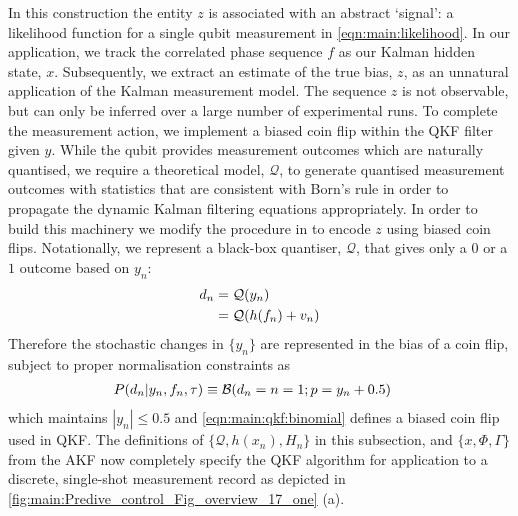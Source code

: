 \documentclass[pra, reprint]{revtex4-1}
\begin{document}
In this construction the entity $z$ is associated with an abstract `signal': a likelihood function for a single qubit measurement in \cref{eqn:main:likelihood}.  In our application, we track the correlated phase sequence $f$ as our Kalman hidden state, $x$. Subsequently, we extract an estimate of the true bias, $z$, as an unnatural application of the Kalman measurement model.  The sequence $z$ is not observable, but can only be inferred over a large number of experimental runs. To complete the measurement action, we implement a biased coin flip within the QKF filter given $y$.  While the qubit provides measurement outcomes which are naturally quantised, we require a theoretical model, $\mathcal{Q}$, to generate quantised measurement outcomes with statistics that are consistent with Born's rule in order to propagate the dynamic Kalman filtering equations appropriately. In order to build this machinery we modify the procedure in \cite{karlsson2005} to encode $z$ using biased coin flips. Notationally, we represent a black-box quantiser, $\mathcal{Q}$, that gives only a $0$ or a $1$ outcome based on $y_n$:
\begin{align}
d_n &= \mathcal{Q}(y_n)\\
&=  \mathcal{Q}(h(f_n) + v_n)
\end{align}
Therefore the stochastic changes in $\{ y_n\}$ are represented in the bias of a coin flip, subject to proper normalisation constraints as  
\begin{align}
P(d_n | y_n, f_{n}, \tau) & \equiv \mathcal{B}(d_n=n=1;p= y_n + 0.5 ) \label{eqn:main:qkf:binomial}
\end{align}
which maintains $|y_n| \leq 0.5$ and \cref{eqn:main:qkf:binomial} defines a biased coin flip used in QKF.   The definitions of $\{ \mathcal{Q}, h(x_n), H_n \}$ in this subsection, and $\{x, \Phi, \Gamma\}$ from the AKF now completely specify the QKF algorithm for application to a discrete, single-shot measurement record as depicted in \cref{fig:main:Predive_control_Fig_overview_17_one} (a).  


\end{document}
